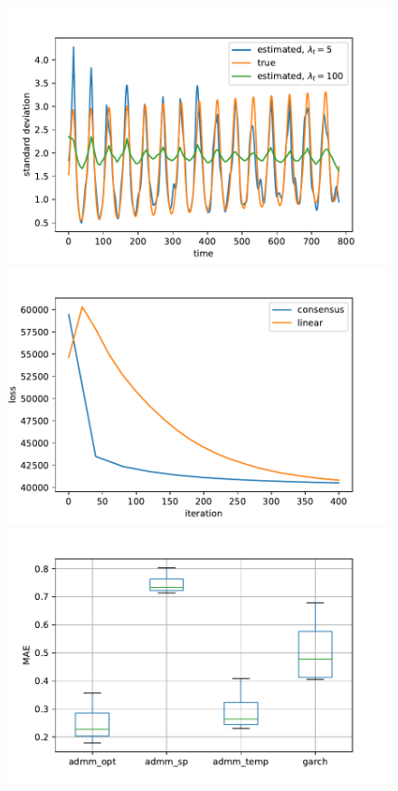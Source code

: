\documentclass{article}
\begin{document}
\begin{figure}[tb]
  \centering	
  \includegraphics[height=.12\textheight]{Figures/true_fitted_var}
  \includegraphics[height=.12\textheight]{Figures/convergence}  
  \includegraphics[height=.12\textheight]{Figures/modelComp_MAE}  

\end{figure}
\end{document}
